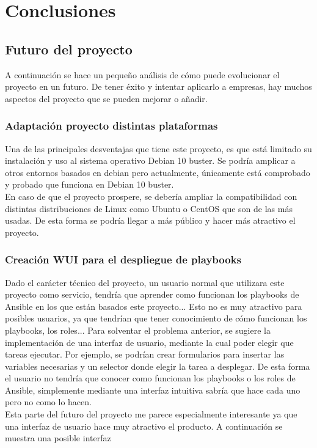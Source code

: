 \chapter {Conclusiones}


\section{Futuro del proyecto}
\begin{paragraph}
	A continuación se hace un pequeño análisis de cómo puede evolucionar el proyecto en un futuro. De tener éxito y intentar aplicarlo a empresas, hay muchos aspectos del proyecto que se pueden mejorar o añadir. 
\end{paragraph}
\subsection{Adaptación proyecto distintas plataformas}
\begin{paragraph}
	Una de las principales desventajas que tiene este proyecto, es que está limitado su instalación y uso al sistema operativo Debian 10 buster. Se podría amplicar a otros entornos basados en debian pero actualmente, únicamente está comprobado y probado que funciona en Debian 10 buster. \\
	En caso de que el proyecto prospere, se debería ampliar la compatibilidad con distintas distribuciones de Linux como Ubuntu o CentOS que son de las más usadas. De esta forma se podría llegar a más público y hacer más atractivo el proyecto.
\end{paragraph}
\subsection{Creación WUI para el despliegue de playbooks}
\begin{paragraph}
	Dado el carácter técnico del proyecto, un usuario normal que utilizara este proyecto como servicio, tendría que aprender como funcionan los playbooks de Ansible en los que están basados este proyecto... Esto no es muy atractivo para posibles usuarios, ya que tendrían que tener conocimiento de cómo funcionan los playbooks, los roles... Para solventar el problema anterior, se sugiere la implementación de una interfaz de usuario, mediante la cual poder elegir que tareas ejecutar. Por ejemplo, se podrían crear formularios para insertar las variables necesarias y un selector donde elegir la tarea a desplegar. De esta forma el usuario no tendría que conocer como funcionan los playbooks o los roles de Ansible, simplemente mediante una interfaz intuitiva sabría que hace cada uno pero no como lo hacen. \\
	Esta parte del futuro del proyecto me parece especialmente interesante ya que una interfaz de usuario hace muy atractivo el producto. A continuación se muestra una posible interfaz
\end{paragraph}
